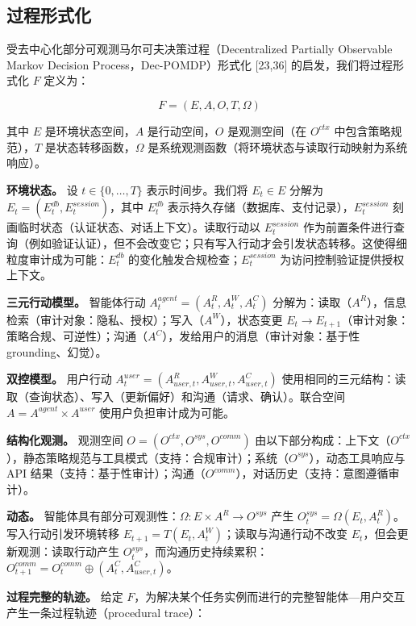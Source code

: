 \documentclass[11pt,UTF8,fontset=fandol]{ctexart}
\begin{document}
\subsection{过程形式化}

受去中心化部分可观测马尔可夫决策过程（Decentralized Partially Observable Markov Decision Process，Dec-POMDP）形式化 [23,36] 的启发，我们将过程形式化 $F$ 定义为：

\begin{equation}
F = (E, A, O, T, \Omega) \tag{1}
\end{equation}

其中 $E$ 是环境状态空间，$A$ 是行动空间，$O$ 是观测空间（在 $O^{ctx}$ 中包含策略规范），$T$ 是状态转移函数，$\Omega$ 是系统观测函数（将环境状态与读取行动映射为系统响应）。

\textbf{环境状态。} 设 $t \in \{0, \ldots, T\}$ 表示时间步。我们将 $E_t \in E$ 分解为 $E_t = (E_t^{db}, E_t^{session})$，其中 $E_t^{db}$ 表示持久存储（数据库、支付记录），$E_t^{session}$ 刻画临时状态（认证状态、对话上下文）。读取行动以 $E_t^{session}$ 作为前置条件进行查询（例如验证认证），但不会改变它；只有写入行动才会引发状态转移。这使得细粒度审计成为可能：$E_t^{db}$ 的变化触发合规检查；$E_t^{session}$ 为访问控制验证提供授权上下文。

\textbf{三元行动模型。} 智能体行动 $A_t^{agent} = (A_t^R, A_t^W, A_t^C)$ 分解为：读取（$A^R$），信息检索（审计对象：隐私、授权）；写入（$A^W$），状态变更 $E_t \to E_{t+1}$（审计对象：策略合规、可逆性）；沟通（$A^C$），发给用户的消息（审计对象：基于性 grounding、幻觉）。

\textbf{双控模型。} 用户行动 $A_t^{user} = (A_{user,t}^R, A_{user,t}^W, A_{user,t}^C)$ 使用相同的三元结构：读取（查询状态）、写入（更新偏好）和沟通（请求、确认）。联合空间 $A = A^{agent} \times A^{user}$ 使用户负担审计成为可能。

\textbf{结构化观测。} 观测空间 $O = (O^{ctx}, O^{sys}, O^{comm})$ 由以下部分构成：上下文（$O^{ctx}$），静态策略规范与工具模式（支持：合规审计）；系统（$O^{sys}$），动态工具响应与 API 结果（支持：基于性审计）；沟通（$O^{comm}$），对话历史（支持：意图遵循审计）。

\textbf{动态。} 智能体具有部分可观测性：$\Omega : E \times A^R \to O^{sys}$ 产生 $O_t^{sys} = \Omega(E_t, A_t^R)$。写入行动引发环境转移 $E_{t+1} = T(E_t, A_t^W)$；读取与沟通行动不改变 $E_t$，但会更新观测：读取行动产生 $O_t^{sys}$，而沟通历史持续累积：$O_{t+1}^{comm} = O_t^{comm} \oplus (A_t^C, A_{user,t}^C)$。

\textbf{过程完整的轨迹。} 给定 $F$，为解决某个任务实例而进行的完整智能体—用户交互产生一条过程轨迹（procedural trace）：
\end{document}
